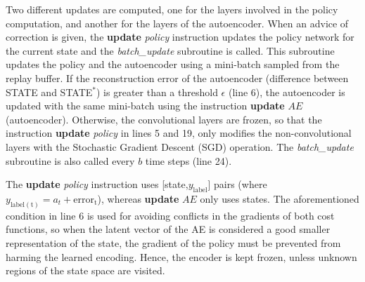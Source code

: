 Two different updates are computed, one for the layers involved in the policy computation, and another for the layers of the autoencoder. When an advice of correction is given, the \textbf{update} \emph{policy} instruction updates the policy network for the current state and the \emph{batch\_update} subroutine is called. This subroutine updates the policy and the autoencoder using a mini-batch sampled from the replay buffer. If the reconstruction error of the autoencoder (difference between STATE and STATE$^{*}$) is greater than a threshold $\epsilon$ (line 6), the autoencoder is updated with the same mini-batch using the instruction \textbf{update} $AE$ (autoencoder). Otherwise, the convolutional layers are frozen, so that the instruction \textbf{update} \emph{policy} in lines 5 and 19, only modifies the non-convolutional layers with the Stochastic Gradient Descent (SGD) operation. The \emph{batch\_update} subroutine is also called every $b$ time steps (line 24).

 The \textbf{update} \emph{policy} instruction uses [state,$y_\mathrm{label}$] pairs (where $y_\mathrm{label(t)}=a_{t}+\mathrm{error_{t}}$), whereas \textbf{update} $AE$ only uses states. The aforementioned condition in line 6 is used for avoiding conflicts in the gradients of both cost functions, so when the latent vector of the AE is considered a good smaller representation of the state, the gradient of the policy must be prevented from harming the learned encoding. Hence, the encoder is kept frozen, unless unknown regions of the state space are visited. 


